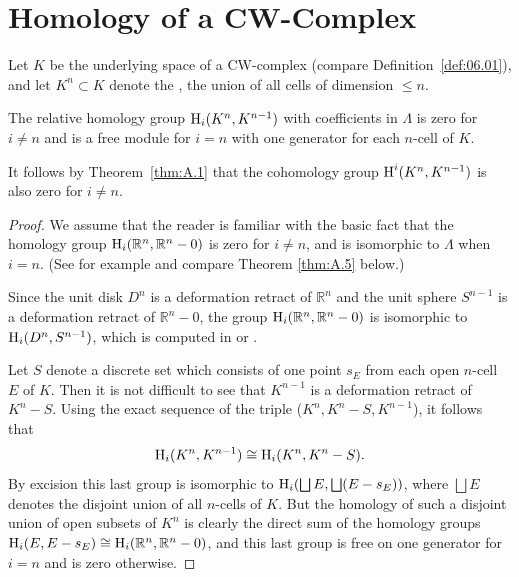 \documentclass[../main]{subfiles}
\begin{document}
\section{Homology of a CW-Complex}
Let $K$ be the underlying space of a CW-complex (compare Definition~\ref{def:06.01}), and let $K^n \subset K$ denote the , the union of all cells of dimension $\leq n$. \\
\begin{lemma}\label{lem:A.2}
The relative homology group $\operatorname{H}_i (K^n , K^{n-1})$ with coefficients in $\Lambda$ is zero for $i\neq n$ and is a free module for $i=n$ with one generator for each $n$-cell of $K$.
\end{lemma}
It follows by Theorem~\ref{thm:A.1} that the cohomology group $\operatorname{H}^i (K^n, K^{n-1})$ is also zero for $i\neq n$.

\begin{proof}
We assume that the reader is familiar with the basic fact that the homology group $\operatorname{H}_i (\mathbb{R}^n, \mathbb{R}^n - 0)$ is zero for $i\neq n$, and is isomorphic to $\Lambda$ when $i=n$. (See for example \cite[p. 56]{dold1972} and compare Theorem \ref{thm:A.5} below.) %

Since the unit disk $D^n$ is a deformation retract of $\mathbb{R}^n$ and the unit sphere $S^{n-1}$ is a deformation retract of $\mathbb{R}^n - 0$, the group $\operatorname{H}_i (\mathbb{R}^n, \mathbb{R}^n-0)$ is isomorphic to $\operatorname{H}_i (D^n, S^{n-1})$, which is computed in \cite[p. 45]{eilenbergsteenrod1952} or \cite[p. 190]{spanier1981}.

Let $S$ denote a discrete set which consists of one point $s_E$ from each open $n$-cell $E$ of $K$. Then it is not difficult to see that $K^{n-1}$ is a deformation retract of $K^n - S$. Using the exact sequence of the triple ($K^n, K^n - S, K^{n-1}$), it follows that \[\operatorname{H}_i(K^n, K^{n-1})\cong \operatorname{H}_i (K^n, K^n - S).\] By excision this last group is isomorphic to $\operatorname{H}_i (\bigsqcup E, \bigsqcup (E-s_E))$, where $\bigsqcup E$ denotes the disjoint union of all $n$-cells of $K$. But the homology of such a disjoint union of open subsets of $K^n$ is clearly the direct sum of the homology groups\newline  $\operatorname{H}_i (E, E-s_E)\cong \operatorname{H}_i (\mathbb{R}^n , \mathbb{R}^n - 0)$, and this last group is free on one generator for $i=n$ and is zero otherwise.
\end{proof}
\end{document}
